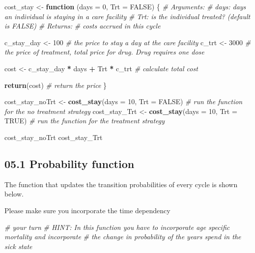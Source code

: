 \documentclass[
]{article}
\newenvironment{Shaded}{\begin{snugshade}}{\end{snugshade}}
\newcommand{\CommentTok}[1]{\textcolor[rgb]{0.56,0.35,0.01}{\textit{#1}}}
\newcommand{\ControlFlowTok}[1]{\textcolor[rgb]{0.13,0.29,0.53}{\textbf{#1}}}
\newcommand{\DataTypeTok}[1]{\textcolor[rgb]{0.13,0.29,0.53}{#1}}
\newcommand{\DecValTok}[1]{\textcolor[rgb]{0.00,0.00,0.81}{#1}}
\newcommand{\KeywordTok}[1]{\textcolor[rgb]{0.13,0.29,0.53}{\textbf{#1}}}
\newcommand{\NormalTok}[1]{#1}
\newcommand{\OperatorTok}[1]{\textcolor[rgb]{0.81,0.36,0.00}{\textbf{#1}}}
\newcommand{\OtherTok}[1]{\textcolor[rgb]{0.56,0.35,0.01}{#1}}
\newcommand{\StringTok}[1]{\textcolor[rgb]{0.31,0.60,0.02}{#1}}
\begin{document}
\begin{Shaded}
\begin{Highlighting}[]
\NormalTok{cost_stay <-}\StringTok{ }\ControlFlowTok{function}\NormalTok{ (}\DataTypeTok{days =} \DecValTok{0}\NormalTok{, }\DataTypeTok{Trt =} \OtherTok{FALSE}\NormalTok{) \{}
  \CommentTok{# Arguments:}
    \CommentTok{# days: days an individual is staying in a care facility}
    \CommentTok{# Trt: is the individual treated? (default is FALSE)}
  \CommentTok{# Returns:}
    \CommentTok{# costs accrued in this cycle}
  
\NormalTok{  c_stay_day <-}\StringTok{ }\DecValTok{100}   \CommentTok{# the price to stay a day at the care facility}
\NormalTok{  c_trt     <-}\StringTok{ }\DecValTok{3000}   \CommentTok{# the price of treatment, total price for drug. Drug requires one dose}
  
\NormalTok{  cost <-}\StringTok{ }\NormalTok{c_stay_day }\OperatorTok{*}\StringTok{ }\NormalTok{days }\OperatorTok{+}\StringTok{ }\NormalTok{Trt }\OperatorTok{*}\StringTok{ }\NormalTok{c_trt }\CommentTok{# calculate total cost}

  \KeywordTok{return}\NormalTok{(cost)       }\CommentTok{# return the price}
\NormalTok{\}}

\NormalTok{cost_stay_noTrt <-}\StringTok{ }\KeywordTok{cost_stay}\NormalTok{(}\DataTypeTok{days =} \DecValTok{10}\NormalTok{, }\DataTypeTok{Trt =} \OtherTok{FALSE}\NormalTok{) }\CommentTok{# run the function for the no treatment strategy}
\NormalTok{cost_stay_Trt   <-}\StringTok{ }\KeywordTok{cost_stay}\NormalTok{(}\DataTypeTok{days =} \DecValTok{10}\NormalTok{, }\DataTypeTok{Trt =} \OtherTok{TRUE}\NormalTok{) }\CommentTok{# run the function for the treatment strategy}

\NormalTok{cost_stay_noTrt}
\NormalTok{cost_stay_Trt}
\end{Highlighting}
\end{Shaded}

\hypertarget{probability-function}{%
\subsection{05.1 Probability function}\label{probability-function}}

The function that updates the transition probabilities of every cycle is
shown below.

Please make sure you incorporate the time dependency

\begin{Shaded}
\begin{Highlighting}[]
\CommentTok{# your turn}
\CommentTok{# HINT: In this function you have to incorporate age specific mortality and incorporate }
\CommentTok{# the change in probability of the years spend in the sick state}
\end{Highlighting}
\end{Shaded}
\end{document}
